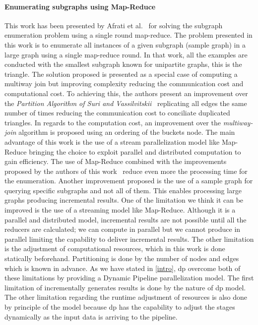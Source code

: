 \paragraph{Enumerating subgraphs using Map-Reduce} This work has been presented by Afrati et al.~\cite{enumeratingsg} for solving the subgraph enumeration problem using a single round map-reduce.
The problem presented in this work is to enumerate all instances of a given subgraph (sample graph) in a large graph using a single map-reduce round. 
In that work, all the examples are conducted with the smallest subgraph known for unipartite graphs, this is the triangle.
The solution proposed is presented as a special case of computing a multiway join but improving complexity reducing the communication cost and computational cost.
To achieving this, the authors present an improvement over the \emph{Partition Algorithm of Suri and Vassilvitskii}~\cite{partitionalgo} replicating all edges the same number of times reducing the communication cost to conciliate duplicated triangles. 
In regards to the computation cost, an improvement over the \emph{multiway-join} algorithm is proposed using an ordering of the buckets node. 
The main advantage of this work is the use of a stream parallelization model like Map-Reduce bringing the choice to exploit parallel and distributed computation to gain efficiency. 
The use of Map-Reduce combined with the improvements proposed by the authors of this work~\cite{enumeratingsg} reduce even more the processing time for the enumeration. 
Another improvement proposed is the use of a sample graph for querying specific subgraphs and not all of them. This enables processing large graphs producing incremental results.
One of the limitation we think it can be improved is the use of a streaming model like Map-Reduce. Although it is a parallel and distributed model, incremental results are not possible until all the reducers are calculated; we can compute in parallel but we cannot produce in parallel limiting the capability to deliver incremental results. 
The other limitation is the adjustment of computational resources, which in this work is done statically beforehand. Partitioning is done by the number of nodes and edges which is known in advance.
As we have stated in \autoref{intro}, \acrshort{dp} overcome both of these limitations by providing a Dynamic Pipeline parallelization model. The first limitation of incrementally generates results is done by the nature of \acrshort{dp} model. 
The other limitation regarding the runtime adjustment of resources is also done by principle of the model because \acrshort{dp} has the capability to adjust the stages dynamically as the input data is arriving to the pipeline. 

